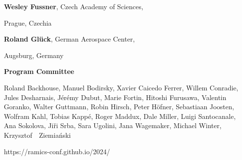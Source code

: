 \documentclass[a3paper, 12pt]{article}
\begin{document}
\begin{minipage}[t]{.43\linewidth}
  \hfill \textbf{Wesley Fussner}, Czech Academy of Sciences,

  \hfill Prague, Czechia

  \hfill \textbf{Roland Glück}, German Aerospace Center,

  \hfill Augsburg, Germany

  \bigskip

  \hfill {\Large \bf Program Committee}

  \smallskip

  Roland Backhouse,
  Manuel Bodirsky,
  Xavier Caicedo Ferrer,
  Willem Conradie,
  Jules Desharnais,
  Jérémy Dubut,
  Marie Fortin,
  Hitoshi Furusawa,
  Valentin Goranko,
  Walter Guttmann,
  Robin Hirsch,
  Peter Höfner,
  Sebastiaan Joosten,
  Wolfram Kahl,
  Tobias Kappé,
  Roger Maddux,
  Dale Miller,
  Luigi Santocanale,
  Ana Sokolova,
  Jiři Srba,
  Sara Ugolini,
  Jana Wagemaker,
  Michael Winter,
  Krzysztof~~Ziemiański

  \vspace{8ex}

  \hspace*{-15ex} {\fontsize{30}{40}\selectfont https://ramics-conf.github.io/2024/}

  \vspace*{-2ex}

\end{minipage}
\end{document}
